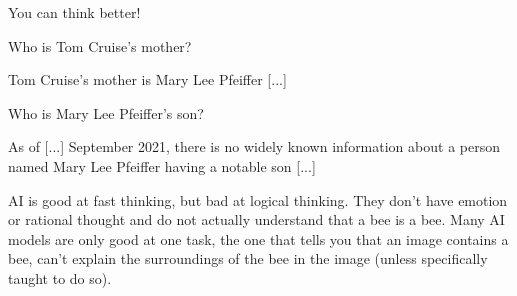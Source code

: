 \documentclass[final]{beamer}
\newlength{\colwidth}
\begin{document}
\begin{frame}{}
\begin{columns}[t]
\begin{column}{\colwidth}
\begin{myblock}{You can think better!}
    \begin{minipage}[t]{0.49\textwidth}
        \smaller[1]
        \begin{tcolorbox}[colback=blockcolor]
        Who is Tom Cruise's mother?
        \end{tcolorbox}
        \vspace{-1cm}
        \begin{tcolorbox}[colback=blockcolor]
        Tom Cruise's mother is Mary Lee Pfeiffer [...]
        \end{tcolorbox}
    \end{minipage}
    \hfill%
    \begin{minipage}[t]{0.49\textwidth}
        \smaller[1]
        \begin{tcolorbox}[colback=blockcolor]
        Who is Mary Lee Pfeiffer's son?
        \end{tcolorbox}
        \vspace{-1cm}
        \begin{tcolorbox}[colback=blockcolor]
        As of [...] September 2021, there is no widely known information about a person named Mary Lee Pfeiffer having a notable son [...]
        \end{tcolorbox}
    \end{minipage}
    
    \vspace{0.7cm}
    AI is good at fast thinking, but bad at logical thinking. They don't have emotion or rational thought and do not actually understand that a bee is a bee.
    Many AI models are only good at one task, the one that tells you that an image contains a bee, can’t explain the surroundings of the bee in the image (unless specifically taught to do so).
    \end{myblock}


\end{column}
\end{columns}
\end{frame}
\end{document}
